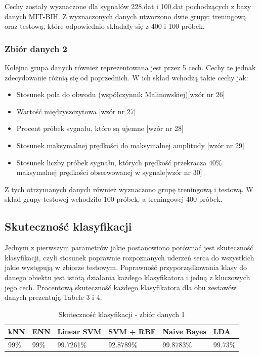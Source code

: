 \documentclass[[10pt,a4paper]{article}
\begin{document}
Cechy zostały wyznaczone dla sygnałów 228.dat i 100.dat pochodzących z bazy danych MIT-BIH. Z wyznaczonych danych utworzono dwie grupy: treningową oraz testową, które odpowiednio składały się z 400 i 100 próbek. 

\subsubsection{Zbiór danych 2}
Kolejna grupa danych również reprezentowana jest przez 5 cech. Cechy te jednak zdecydowanie różnią się od poprzednich. W ich skład wchodzą takie cechy jak:

\begin{itemize}
	\item{Stosunek pola do obwodu (współczynnik Malinowskiej)[wzór nr 26]}
	
	\item{Wartość międzyszczytowa [wzór nr 27]}
	
	\item{Procent próbek sygnału, które są ujemne [wzór nr 28]}
	
	\item{Stosunek maksymalnej prędkości do maksymalnej amplitudy [wzór nr 29]}
	
	\item{Stosunek liczby próbek sygnału, których prędkość przekracza 40\% maksymalnej prędkości obserwowanej w sygnale[wzór nr 30]}
	
\end{itemize}

Z tych otrzymanych danych również wyznaczono grupę treningową i testową. W skład grupy testowej wchodziło  100 próbek, a treningowej 400 próbek.

\subsection{Skuteczność klasyfikacji}

Jednym z pierwszym parametrów jakie postanowiono porównać jest skuteczność klasyfikacji, czyli stosunek poprawnie rozpoznanych uderzeń serca do wszystkich jakie występują w zbiorze testowym. Poprawność przyporządkowania klasy do danego obiektu jest istotą działania każdego klasyfikatora i jedną z kluczowych jego cech. Procentową skuteczność każdego klasyfikatora  dla obu zestawów danych prezentują Tabele 3 i 4.

\begin{table}[h]
\centering
\caption{Skuteczność klasyfikacji - zbiór danych 1}
\label{accuracyTable2}
\begin{tabular}{|l|l|l|l|l|l|}
\hline
kNN & ENN & Linear SVM & SVM + RBF & Naive Bayes & LDA \\ \hline
  99\%   &  99\%  & 99.7261\%       & 92.8789\%      & 99.8783\%        &   99.73\%  \\ \hline
\end{tabular}
\end{table}
\end{document}
